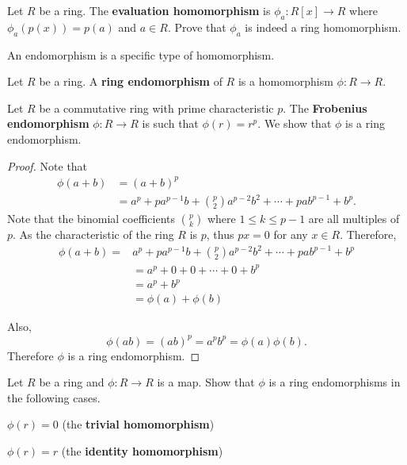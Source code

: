 \begin{exercise}
    Let $R$ be a ring. The \textbf{evaluation homomorphism} is $\phi_a: R[x] \to R$ where $\phi_a(p(x)) = p(a)$ and $a \in R$. Prove that $\phi_a$ is indeed a ring homomorphism.
\end{exercise}

An endomorphism is a specific type of homomorphism.
\begin{definition}
    Let $R$ be a ring. A \textbf{ring endomorphism} of $R$ is a homomorphism $\phi: R \to R$.
\end{definition}
\begin{example}
    Let $R$ be a commutative ring with prime characteristic $p$. The \textbf{Frobenius endomorphism} $\phi: R \to R$ is such that $\phi(r) = r^p$. We show that $\phi$ is a ring endomorphism.
    
    \begin{proof}
        Note that
        \begin{align*}
            \phi(a+b) &= (a+b)^p\\
            &= a^p + pa^{p-1}b + {p \choose 2}a^{p-2}b^2 + \cdots + pab^{p-1} + b^p.
        \end{align*}
        Note that the binomial coefficients ${p \choose k}$ where $1 \leq k \leq p -1$ are all multiples of $p$. As the characteristic of the ring $R$ is $p$, thus $px = 0$ for any $x \in R$. Therefore,
        \begin{align*}
            \phi(a+b) = &a^p + pa^{p-1}b + {p \choose 2}a^{p-2}b^2 + \cdots + pab^{p-1} + b^p\\
            &= a^p + 0 + 0 + \cdots + 0 + b^p\\
            &= a^p + b^p\\
            &=\phi(a) + \phi(b)
        \end{align*}

        Also,
        \[
            \phi(ab) = (ab)^p = a^pb^p = \phi(a)\phi(b).
        \]
        Therefore $\phi$ is a ring endomorphism.
    \end{proof}
\end{example}

\begin{exercise}
    Let $R$ be a ring and $\phi: R \to R$ is a map. Show that $\phi$ is a ring endomorphisms in the following cases.
    \begin{partquestions}{\alph*}
        \item $\phi(r) = 0$ (the \textbf{trivial homomorphism})
        \item $\phi(r) = r$ (the \textbf{identity homomorphism})
    \end{partquestions}
\end{exercise}


